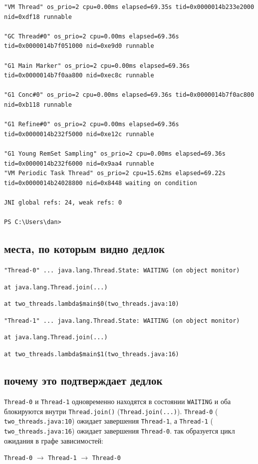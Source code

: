 \documentclass[12pt]{article}
\newcommand{\keyline}[1]{%
  \noindent\colorbox{yellow!25}{\parbox{\dimexpr\linewidth-2\fboxsep\relax}{\texttt{#1}}}%
}
\begin{document}
\begin{lstlisting}
"VM Thread" os_prio=2 cpu=0.00ms elapsed=69.35s tid=0x0000014b233e2000 nid=0xdf18 runnable

"GC Thread#0" os_prio=2 cpu=0.00ms elapsed=69.36s tid=0x0000014b7f051000 nid=0xe9d0 runnable

"G1 Main Marker" os_prio=2 cpu=0.00ms elapsed=69.36s tid=0x0000014b7f0aa800 nid=0xec8c runnable

"G1 Conc#0" os_prio=2 cpu=0.00ms elapsed=69.36s tid=0x0000014b7f0ac800 nid=0xb118 runnable

"G1 Refine#0" os_prio=2 cpu=0.00ms elapsed=69.36s tid=0x0000014b232f5000 nid=0xe12c runnable

"G1 Young RemSet Sampling" os_prio=2 cpu=0.00ms elapsed=69.36s tid=0x0000014b232f6000 nid=0x9aa4 runnable
"VM Periodic Task Thread" os_prio=2 cpu=15.62ms elapsed=69.22s tid=0x0000014b24028800 nid=0x8448 waiting on condition

JNI global refs: 24, weak refs: 0

PS C:\Users\dan>
\end{lstlisting}

\subsection*{места, по которым видно дедлок}

\keyline{"Thread-0" ... java.lang.Thread.State: WAITING (on object monitor)}

\keyline{at java.lang.Thread.join(...)}

\keyline{at two\_threads.lambda\$main\$0(two\_threads.java:10)}

\vspace{0.3cm}

\keyline{"Thread-1" ... java.lang.Thread.State: WAITING (on object monitor)}

\keyline{at java.lang.Thread.join(...)}

\keyline{at two\_threads.lambda\$main\$1(two\_threads.java:16)}

\subsection*{почему это подтверждает дедлок}

\texttt{Thread-0} и \texttt{Thread-1} одновременно находятся в состоянии \texttt{WAITING}
и оба блокируются внутри \texttt{Thread.join()} (\texttt{Thread.join(...)}).
\texttt{Thread-0} ( \texttt{two\_threads.java:10}) ожидает завершения \texttt{Thread-1},
а \texttt{Thread-1} ( \texttt{two\_threads.java:16}) ожидает завершения \texttt{Thread-0}.
так образуется цикл ожидания в графе зависимостей:

\begin{center}
\texttt{Thread-0} $\rightarrow$ \texttt{Thread-1} $\rightarrow$ \texttt{Thread-0}
\end{center}
\end{document}
